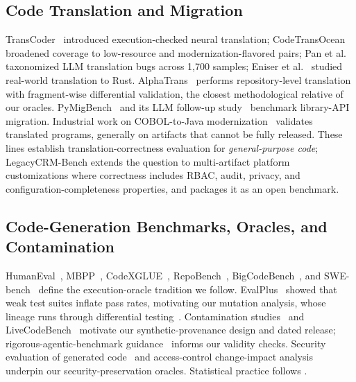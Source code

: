 \documentclass{ieeetj}
\begin{document}
\subsection{Code Translation and Migration}
TransCoder~\cite{lachaux2020transcoder} introduced execution-checked neural translation;
CodeTransOcean~\cite{yan2023codetransocean} broadened coverage to low-resource and
modernization-flavored pairs; Pan et al.~\cite{pan2024lost} taxonomized LLM translation bugs
across 1{,}700 samples; Eniser et al.~\cite{eniser2024rust} studied real-world translation to
Rust. AlphaTrans~\cite{ibrahimzada2025alphatrans} performs repository-level translation with
fragment-wise differential validation, the closest methodological relative of our oracles.
PyMigBench~\cite{islam2023pymigbench} and its LLM follow-up study~\cite{islam2025libmigration}
benchmark library-API migration. Industrial work on COBOL-to-Java
modernization~\cite{diggs2024legacy, hans2025coboltesting, kumar2025cobolvalidation,
froimovich2025cobolquality} validates translated programs, generally on artifacts that cannot
be fully released. These lines establish translation-correctness evaluation for
\emph{general-purpose code}; LegacyCRM-Bench extends the question to multi-artifact platform
customizations where correctness includes RBAC, audit, privacy, and configuration-completeness
properties, and packages it as an open benchmark.

\subsection{Code-Generation Benchmarks, Oracles, and Contamination}
HumanEval~\cite{chen2021humaneval}, MBPP~\cite{austin2021mbpp}, CodeXGLUE~\cite{lu2021codexglue},
RepoBench~\cite{liu2023repobench}, BigCodeBench~\cite{zhuo2024bigcodebench}, and
SWE-bench~\cite{jimenez2024swebench} define the execution-oracle tradition we follow.
EvalPlus~\cite{liu2023evalplus} showed that weak test suites inflate pass rates, motivating our
mutation analysis, whose lineage runs through differential testing~\cite{yang2011csmith}.
Contamination studies~\cite{golchin2024timetravel, sainz2023contamination} and
LiveCodeBench~\cite{jain2024livecodebench} motivate our synthetic-provenance design and dated
release; rigorous-agentic-benchmark guidance~\cite{zhu2025rigorous} informs our validity
checks. Security evaluation of generated code~\cite{pearce2022asleep, bhatt2023cyberseceval,
bhatt2024cyberseceval2} and access-control change-impact analysis~\cite{fisler2005margrave}
underpin our security-preservation oracles. Statistical practice follows
\cite{miller2024errorbars, efron1979bootstrap, dror2018hitchhiker}.
\end{document}
